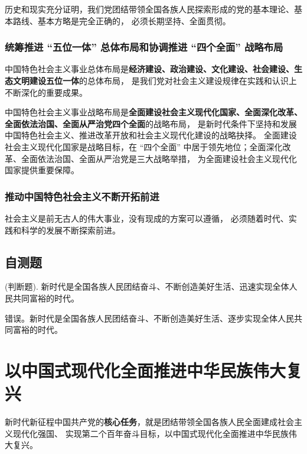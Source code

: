 \documentclass[UTF8,10pt]{ctexbook} %
\begin{document}
历史和现实充分证明，我们党团结带领全国各族人民探索形成的党的基本理论、基本路线、基本方略是完全正确的，
必须长期坚持、全面贯彻。

\subsection{统筹推进 “五位一体” 总体布局和协调推进 “四个全面” 战略布局}

中国特色社会主义事业总体布局是\textbf{经济建设、政治建设、文化建设、社会建设、生态文明建设五位一体}的总体布局，
是我们党对社会主义建设规律在实践和认识上不断深化的重要成果。

中国特色社会主义事业战略布局是\textbf{全面建设社会主义现代化国家、全面深化改革、全面依法治国、全面从严治党四个全面}的战略布局，
是新时代条件下坚持和发展中国特色社会主义、推进改革开放和社会主义现代化建设的战略抉择。
全面建设社会主义现代化国家是战略目标，在 “四个全面” 中居于领先地位；全面深化改革、全面依法治国、全面从严治党是三大战略举措，
为全面建设社会主义现代化国家提供重要保障。

\subsection{推动中国特色社会主义不断开拓前进}

社会主义是前无古人的伟大事业，没有现成的方案可以遵循，
必须随着时代、实践和科学的发展不断探索前进。

\section{自测题}
\setcounter{example}{0}

\begin{example}
    (判断题). 新时代是全国各族人民团结奋斗、不断创造美好生活、迅速实现全体人民共同富裕的时代。
    \begin{sol}
        错误。新时代是全国各族人民团结奋斗、不断创造美好生活、逐步实现全体人民共同富裕的时代。
    \end{sol}
\end{example}



\newpage
\thispagestyle{empty}

\chapter{以中国式现代化全面推进中华民族伟大复兴}

新时代新征程中国共产党的\textbf{核心任务}，就是团结带领全国各族人民全面建成社会主义现代化强国、
实现第二个百年奋斗目标，以中国式现代化全面推进中华民族伟大复兴。
\end{document}
